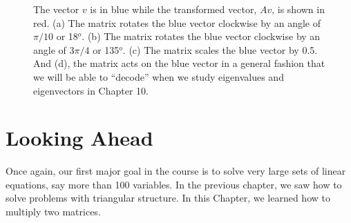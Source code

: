 \vspace*{.2cm} 
\begin{figure}[hbt!]
\centering
{}%
\hspace{5pt}%
%
\hspace{5pt}%
%
\hspace{5pt}%
%
\caption{The vector $v$ is in blue while the transformed vector, $A v$, is shown in red. (a) The matrix rotates the blue vector clockwise by an angle of $\pi/10$ or 18$^o$. (b) The matrix rotates the blue vector clockwise by an angle of $3 \pi/4$ or 135$^o$. (c) The matrix scales the blue vector by 0.5. And (d), the matrix acts on the blue vector in a general fashion that we will be able to ``decode'' when we study eigenvalues and eigenvectors in Chapter 10.}
\label{fig:PeakAtMatrixVectorMultiplication}
\end{figure}

\section{Looking Ahead}

Once again, our first major goal in the course is to solve very large sets of linear equations, say more than 100 variables. In the previous chapter, we saw how to solve problems with triangular structure. In this Chapter, we learned how to multiply two matrices.\\

